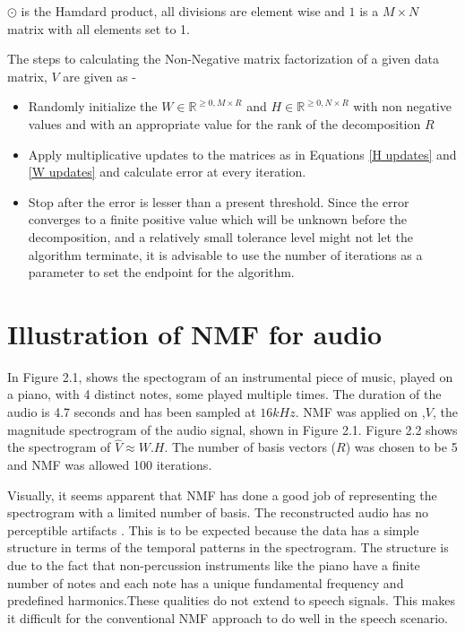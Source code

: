 \documentclass[12pt, a4paper, oneside]{book}
\begin{document}
$ \odot $ is the Hamdard product, all divisions are element wise and $1$ is a $M \times N$ matrix with all elements set to 1.

The steps to calculating the Non-Negative matrix factorization of a given data matrix, $V$ are given as -
\begin{itemize}
\item Randomly initialize the $W \in \mathbb{R}^{\geq 0, M \times R}$ and $H \in \mathbb{R}^{\geq 0, N \times R}$ with non negative values and with an appropriate value for the rank of the decomposition $R$
\item Apply multiplicative updates to the matrices as in Equations \ref{H updates} and \ref{W updates}  and calculate error at every iteration.
\item Stop after the error is lesser than a present threshold. Since the error converges to a finite positive value which will be unknown before the decomposition, and a relatively small tolerance level might not let the algorithm terminate,  it is advisable to use the number of iterations as a parameter to set the endpoint for the algorithm. 
\end{itemize}


\section{Illustration of NMF for audio}
In Figure 2.1, shows the spectogram of an instrumental piece of music, played on a piano, with 4 distinct notes, some played multiple  times. The duration of the audio is 4.7 seconds and has been sampled at $16kHz$. NMF was applied on ,$V$, the magnitude spectrogram of the audio signal, shown in Figure 2.1. Figure 2.2 shows the spectrogram of $\hat{V} \approx W.H$. The number of basis vectors ($R$) was chosen to be 5 and NMF was allowed 100 iterations.

Visually, it seems apparent that NMF has done a good job of representing the spectrogram with a limited number of basis. The reconstructed audio has no perceptible artifacts \cite{A}.  This is to be expected because the data has a simple structure in terms of the temporal patterns in the spectrogram. The structure is due to the fact that non-percussion instruments like the piano have a finite number of notes and each note has a unique fundamental frequency and predefined harmonics.These qualities do not extend to speech signals. This makes it difficult for the conventional NMF approach to do well in the speech scenario.
\end{document}
